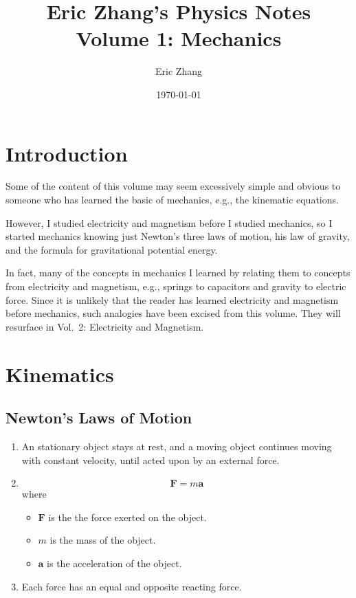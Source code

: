 \documentclass[a4paper, titlepage]{book}
\title{
    Eric Zhang's Physics Notes \\
    \large Volume 1: Mechanics
}
\author{Eric Zhang}
\date{\today}
\begin{document}
\frontmatter
\maketitle
\tableofcontents


\chapter{Introduction}

Some of the content of this volume may seem excessively simple and obvious
to someone who has learned the basic of mechanics,
e.g., the kinematic equations.

However, I studied electricity and magnetism before I studied mechanics,
so I started mechanics knowing just Newton's three laws of motion,
his law of gravity, and the formula for gravitational potential energy.

In fact, many of the concepts in mechanics I learned
by relating them to concepts from electricity and magnetism,
e.g., springs to capacitors and gravity to electric force.
Since it is unlikely that the reader
has learned electricity and magnetism before mechanics,
such analogies have been excised from this volume.
They will resurface in Vol.~2: Electricity and Magnetism.


\mainmatter


\chapter{Kinematics}

\section{Newton's Laws of Motion}

\begin{enumerate}
    \item \label{itm:newtons-1st-law}
        An stationary object stays at rest,
        and a moving object continues moving with constant velocity,
        until acted upon by an external force.
    \item
        \begin{equation} \label{eq:newtons-2nd-law}
            \bm{F} = m\bm{a}
        \end{equation}
        where
        \begin{itemize}
            \item \(\bm{F}\) is the the force exerted on the object.
            \item \(m\) is the mass of the object.
            \item \(\bm{a}\) is the acceleration of the object.
        \end{itemize}
    \item \label{itm:newtons-3rd-law}
        Each force has an equal and opposite reacting force.
\end{enumerate}
\end{document}
